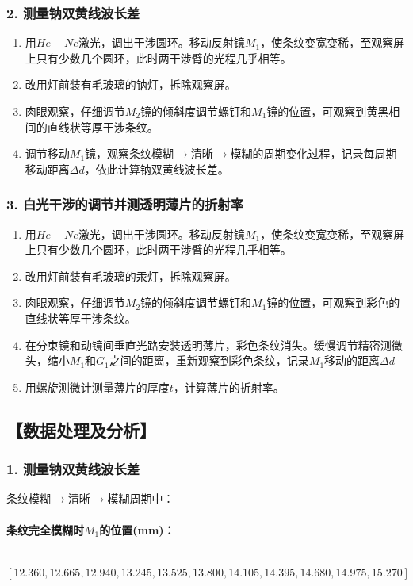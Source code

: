 \documentclass[12pt,a4paper,UTF8]{ctexart}
\begin{document}
	\subsubsection*{2. 测量钠双黄线波长差}
		\begin{enumerate}[label=\arabic*.]
			\item 用$ He-Ne $激光，调出干涉圆环。移动反射镜$M_1$，使条纹变宽变稀，至观察屏上只有少数几个圆环，此时两干涉臂的光程几乎相等。
			\item 改用灯前装有毛玻璃的钠灯，拆除观察屏。
			\item 肉眼观察，仔细调节$M_2$镜的倾斜度调节螺钉和$M_1$镜的位置，可观察到黄黑相间的直线状等厚干涉条纹。
			\item 调节移动$M_1$镜，观察条纹模糊$\to$清晰$\to$模糊的周期变化过程，记录每周期移动距离$\Delta d$，依此计算钠双黄线波长差。
		\end{enumerate}

	\subsubsection*{3. 白光干涉的调节并测透明薄片的折射率}
		\begin{enumerate}[label=\arabic*.]
			\item 用$ He-Ne $激光，调出干涉圆环。移动反射镜$M_1$，使条纹变宽变稀，至观察屏上只有少数几个圆环，此时两干涉臂的光程几乎相等。
			\item 改用灯前装有毛玻璃的汞灯，拆除观察屏。
			\item 肉眼观察，仔细调节$M_2$镜的倾斜度调节螺钉和$M_1$镜的位置，可观察到彩色的直线状等厚干涉条纹。
			\item 在分束镜和动镜间垂直光路安装透明薄片，彩色条纹消失。缓慢调节精密测微头，缩小$M_1$和$G_1$之间的距离，重新观察到彩色条纹，记录$M_1$移动的距离$\Delta d$
			\item 用螺旋测微计测量薄片的厚度$t$，计算薄片的折射率。
		\end{enumerate}


\subsection*{【数据处理及分析】}
	\subsubsection*{1. 测量钠双黄线波长差}
		条纹模糊$\to$清晰$\to$模糊周期中：
		\paragraph{条纹完全模糊时$M_1$的位置(mm)：}~
		\newline
		\indent
		$$
		[12.360,12.665,12.940,13.245,13.525,13.800,14.105,14.395,14.680,14.975,15.270]
		$$
\end{document}
